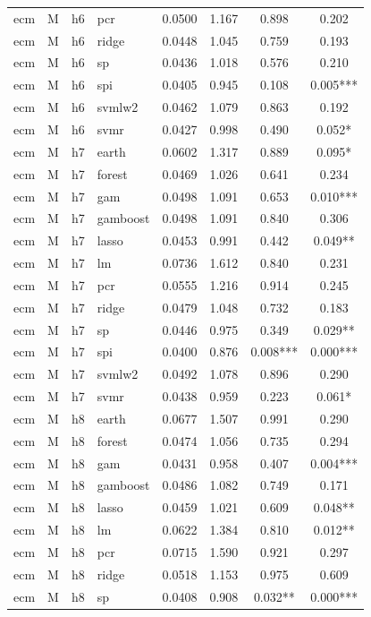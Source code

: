 \begin{ThreePartTable}
\begin{longtable}[t]{llclcccc}
ecm & M & h6 & pcr & 0.0500 & 1.167 & 0.898 & 0.202\\
ecm & M & h6 & ridge & 0.0448 & 1.045 & 0.759 & 0.193\\
ecm & M & h6 & sp & 0.0436 & 1.018 & 0.576 & 0.210\\
ecm & M & h6 & spi & 0.0405 & 0.945 & 0.108 & 0.005***\\
ecm & M & h6 & svmlw2 & 0.0462 & 1.079 & 0.863 & 0.192\\
ecm & M & h6 & svmr & 0.0427 & 0.998 & 0.490 & 0.052*\\
\addlinespace
ecm & M & h7 & earth & 0.0602 & 1.317 & 0.889 & 0.095*\\
ecm & M & h7 & forest & 0.0469 & 1.026 & 0.641 & 0.234\\
ecm & M & h7 & gam & 0.0498 & 1.091 & 0.653 & 0.010***\\
ecm & M & h7 & gamboost & 0.0498 & 1.091 & 0.840 & 0.306\\
ecm & M & h7 & lasso & 0.0453 & 0.991 & 0.442 & 0.049**\\
ecm & M & h7 & lm & 0.0736 & 1.612 & 0.840 & 0.231\\
ecm & M & h7 & pcr & 0.0555 & 1.216 & 0.914 & 0.245\\
ecm & M & h7 & ridge & 0.0479 & 1.048 & 0.732 & 0.183\\
ecm & M & h7 & sp & 0.0446 & 0.975 & 0.349 & 0.029**\\
ecm & M & h7 & spi & 0.0400 & 0.876 & 0.008*** & 0.000***\\
ecm & M & h7 & svmlw2 & 0.0492 & 1.078 & 0.896 & 0.290\\
ecm & M & h7 & svmr & 0.0438 & 0.959 & 0.223 & 0.061*\\
\addlinespace
ecm & M & h8 & earth & 0.0677 & 1.507 & 0.991 & 0.290\\
ecm & M & h8 & forest & 0.0474 & 1.056 & 0.735 & 0.294\\
ecm & M & h8 & gam & 0.0431 & 0.958 & 0.407 & 0.004***\\
ecm & M & h8 & gamboost & 0.0486 & 1.082 & 0.749 & 0.171\\
ecm & M & h8 & lasso & 0.0459 & 1.021 & 0.609 & 0.048**\\
ecm & M & h8 & lm & 0.0622 & 1.384 & 0.810 & 0.012**\\
ecm & M & h8 & pcr & 0.0715 & 1.590 & 0.921 & 0.297\\
ecm & M & h8 & ridge & 0.0518 & 1.153 & 0.975 & 0.609\\
ecm & M & h8 & sp & 0.0408 & 0.908 & 0.032** & 0.000***\\

\end{longtable}
\end{ThreePartTable}

